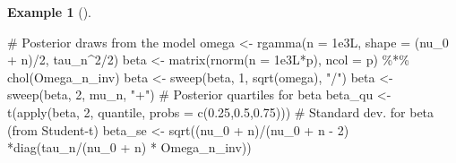 \documentclass[
  11pt,
  letterpaper,
]{scrbook}
\newenvironment{Shaded}{\begin{snugshade}}{\end{snugshade}}
\newcommand{\AttributeTok}[1]{\textcolor[rgb]{0.40,0.45,0.13}{#1}}
\newcommand{\CommentTok}[1]{\textcolor[rgb]{0.37,0.37,0.37}{#1}}
\newcommand{\DecValTok}[1]{\textcolor[rgb]{0.68,0.00,0.00}{#1}}
\newcommand{\FloatTok}[1]{\textcolor[rgb]{0.68,0.00,0.00}{#1}}
\newcommand{\FunctionTok}[1]{\textcolor[rgb]{0.28,0.35,0.67}{#1}}
\newcommand{\NormalTok}[1]{\textcolor[rgb]{0.00,0.23,0.31}{#1}}
\newcommand{\OtherTok}[1]{\textcolor[rgb]{0.00,0.23,0.31}{#1}}
\newcommand{\SpecialCharTok}[1]{\textcolor[rgb]{0.37,0.37,0.37}{#1}}
\newcommand{\StringTok}[1]{\textcolor[rgb]{0.13,0.47,0.30}{#1}}
\theoremstyle{definition}
\newtheorem{example}{Example}[chapter]
\theoremstyle{plain}
\theoremstyle{plain}
\theoremstyle{plain}
\theoremstyle{definition}
\theoremstyle{definition}
\theoremstyle{plain}
\theoremstyle{plain}
\theoremstyle{remark}
\begin{document}
\begin{example}[]
\begin{Shaded}
\begin{Highlighting}[]
\CommentTok{\# Posterior draws from the model}
\NormalTok{omega }\OtherTok{\textless{}{-}} \FunctionTok{rgamma}\NormalTok{(}\AttributeTok{n =} \FloatTok{1e3}\NormalTok{L, }
                \AttributeTok{shape =}\NormalTok{ (nu\_0 }\SpecialCharTok{+}\NormalTok{ n)}\SpecialCharTok{/}\DecValTok{2}\NormalTok{, }
\NormalTok{                tau\_n}\SpecialCharTok{\^{}}\DecValTok{2}\SpecialCharTok{/}\DecValTok{2}\NormalTok{)}
\NormalTok{beta }\OtherTok{\textless{}{-}} \FunctionTok{matrix}\NormalTok{(}\FunctionTok{rnorm}\NormalTok{(}\AttributeTok{n =} \FloatTok{1e3}\NormalTok{L}\SpecialCharTok{*}\NormalTok{p), }\AttributeTok{ncol =}\NormalTok{ p) }\SpecialCharTok{\%*\%} 
  \FunctionTok{chol}\NormalTok{(Omega\_n\_inv)}
\NormalTok{beta }\OtherTok{\textless{}{-}} \FunctionTok{sweep}\NormalTok{(beta, }\DecValTok{1}\NormalTok{, }\FunctionTok{sqrt}\NormalTok{(omega), }\StringTok{"/"}\NormalTok{)}
\NormalTok{beta }\OtherTok{\textless{}{-}} \FunctionTok{sweep}\NormalTok{(beta, }\DecValTok{2}\NormalTok{, mu\_n, }\StringTok{"+"}\NormalTok{)}
\CommentTok{\# Posterior quartiles for beta}
\NormalTok{beta\_qu }\OtherTok{\textless{}{-}} \FunctionTok{t}\NormalTok{(}\FunctionTok{apply}\NormalTok{(beta, }\DecValTok{2}\NormalTok{, quantile, }\AttributeTok{probs =} \FunctionTok{c}\NormalTok{(}\FloatTok{0.25}\NormalTok{,}\FloatTok{0.5}\NormalTok{,}\FloatTok{0.75}\NormalTok{)))}
\CommentTok{\# Standard dev. for beta (from Student{-}t)}
\NormalTok{beta\_se }\OtherTok{\textless{}{-}} \FunctionTok{sqrt}\NormalTok{((nu\_0 }\SpecialCharTok{+}\NormalTok{ n)}\SpecialCharTok{/}\NormalTok{(nu\_0 }\SpecialCharTok{+}\NormalTok{ n }\SpecialCharTok{{-}} \DecValTok{2}\NormalTok{) }\SpecialCharTok{*}\FunctionTok{diag}\NormalTok{(tau\_n}\SpecialCharTok{/}\NormalTok{(nu\_0 }\SpecialCharTok{+}\NormalTok{ n) }\SpecialCharTok{*}\NormalTok{ Omega\_n\_inv))}


\end{Highlighting}
\end{Shaded}
\end{example}
\end{document}

